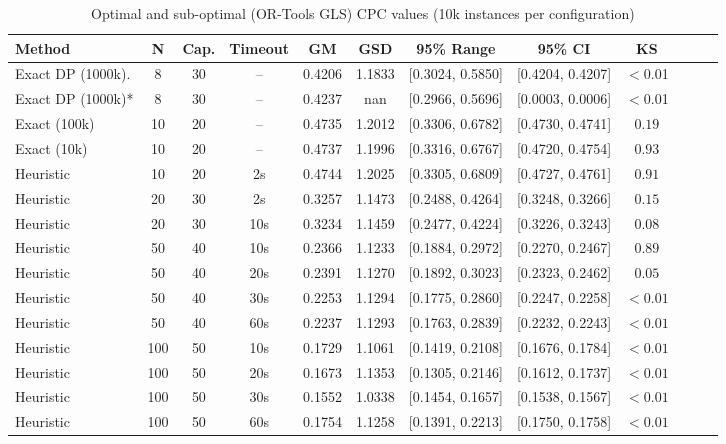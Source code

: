 \documentclass[a4paper,twoside]{article}
\begin{document}
\begin{table}[htbp] 
\centering
\caption{Optimal and sub-optimal (OR-Tools GLS) CPC values (10k instances per configuration)}
\label{tab:ortools-gls-timeout}
\small \begin{tabular}{@{}l c c c S[table-format=1.4] S[table-format=1.4] c c c c c c@{}}
\toprule
\textbf{Method} & \textbf{N} & \textbf{Cap.} & \textbf{Timeout} & {\textbf{GM}} & {\textbf{GSD}} & \textbf{95\% Range} & \textbf{95\% CI} & \textbf{KS} \\
\midrule
Exact DP (1000k). & 8 & 30 &-- & 0.4206 & 1.1833 & [0.3024, 0.5850] & [0.4204, 0.4207] & $<$0.01 \\
Exact DP (1000k)* & 8 & 30 &-- & 0.4237 & nan    & [0.2966, 0.5696] & [0.0003, 0.0006] & $<$0.01 \\
\midrule
Exact (100k) & 10 & 20 & -- & 0.4735 & 1.2012 & [0.3306, 0.6782] & [0.4730, 0.4741] & $0.19$  \\
Exact (10k)  & 10 & 20 & -- & 0.4737 & 1.1996 & [0.3316, 0.6767] & [0.4720, 0.4754] & $0.93$  \\
Heuristic    & 10 & 20 & 2s & 0.4744 & 1.2025 & [0.3305, 0.6809] & [0.4727, 0.4761] & $0.91$  \\
\midrule
Heuristic    & 20 & 30 & 2s & 0.3257 & 1.1473 & [0.2488, 0.4264] & [0.3248, 0.3266] & $0.15$  \\
Heuristic    & 20 & 30 & 10s & 0.3234 & 1.1459 & [0.2477, 0.4224] & [0.3226, 0.3243] & $0.08$ \\
\midrule
Heuristic    & 50 & 40 & 10s & 0.2366 & 1.1233 & [0.1884, 0.2972] & [0.2270, 0.2467] & $0.89$  \\
Heuristic    & 50 & 40 & 20s & 0.2391 & 1.1270 & [0.1892, 0.3023] & [0.2323, 0.2462] & $0.05$  \\
Heuristic    & 50 & 40 & 30s & 0.2253 & 1.1294 & [0.1775, 0.2860] & [0.2247, 0.2258] & $<0.01$ \\
Heuristic    & 50 & 40 & 60s & 0.2237 & 1.1293 & [0.1763, 0.2839] & [0.2232, 0.2243] & $<0.01$ \\
\midrule
Heuristic    & 100 & 50 & 10s & 0.1729 & 1.1061 & [0.1419, 0.2108] & [0.1676, 0.1784] & $<0.01$  \\
Heuristic    & 100 & 50 & 20s & 0.1673 & 1.1353 & [0.1305, 0.2146] & [0.1612, 0.1737] & $<0.01$  \\
Heuristic    & 100 & 50 & 30s & 0.1552 & 1.0338 & [0.1454, 0.1657] & [0.1538, 0.1567] & $<0.01$  \\
Heuristic    & 100 & 50 & 60s & 0.1754 & 1.1258 & [0.1391, 0.2213] & [0.1750, 0.1758] & $<0.01$  \\

\end{tabular}
\end{table}
\end{document}
